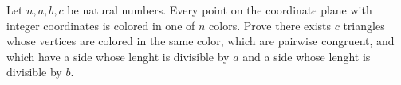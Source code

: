 Let $n,a,b,c$ be natural numbers. Every point on the coordinate plane with integer coordinates is colored in one of $n$ colors. Prove there exists $c$ triangles whose vertices are colored in the same color, which are pairwise congruent, and which have a side whose lenght is divisible by $a$ and a side whose lenght is divisible by $b$.